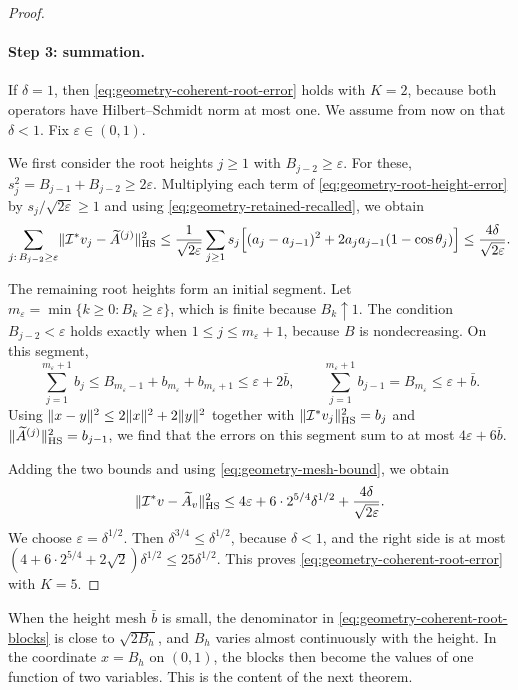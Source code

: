 \begin{proof}
\paragraph{Step 3: summation.}
If $\delta=1$, then \eqref{eq:geometry-coherent-root-error} holds with $K=2$, because both operators have Hilbert--Schmidt norm at most one. We assume from now on that $\delta<1$. Fix $\varepsilon\in(0,1)$.

We first consider the root heights $j\ge1$ with $B_{j-2}\ge\varepsilon$. For these, $s_j^2=B_{j-1}+B_{j-2}\ge2\varepsilon$. Multiplying each term of \eqref{eq:geometry-root-height-error} by $s_j/\sqrt{2\varepsilon}\ge1$ and using \eqref{eq:geometry-retained-recalled}, we obtain
\[
 \sum_{j:\,B_{j-2}\ge\varepsilon}\lVert\mathcal I^*v_j-\widetilde A^{(j)}\rVert_{\mathrm{HS}}^2
 \le\frac1{\sqrt{2\varepsilon}}\sum_{j\ge1}s_j\Bigl[(a_j-a_{j-1})^2+2a_ja_{j-1}(1-\cos\theta_j)\Bigr]
 \le\frac{4\delta}{\sqrt{2\varepsilon}} .
\]

The remaining root heights form an initial segment. Let $m_\varepsilon=\min\{k\ge0:B_k\ge\varepsilon\}$, which is finite because $B_k\uparrow1$. The condition $B_{j-2}<\varepsilon$ holds exactly when $1\le j\le m_\varepsilon+1$, because $B$ is nondecreasing. On this segment,
\[
 \sum_{j=1}^{m_\varepsilon+1}b_j\le B_{m_\varepsilon-1}+b_{m_\varepsilon}+b_{m_\varepsilon+1}\le\varepsilon+2\bar b,
 \qquad
 \sum_{j=1}^{m_\varepsilon+1}b_{j-1}=B_{m_\varepsilon}\le\varepsilon+\bar b .
\]
Using $\lVert x-y\rVert^2\le2\lVert x\rVert^2+2\lVert y\rVert^2$ together with $\lVert\mathcal I^*v_j\rVert_{\mathrm{HS}}^2=b_j$ and $\lVert\widetilde A^{(j)}\rVert_{\mathrm{HS}}^2=b_{j-1}$, we find that the errors on this segment sum to at most $4\varepsilon+6\bar b$.

Adding the two bounds and using \eqref{eq:geometry-mesh-bound}, we obtain
\[
 \lVert\mathcal I^*v-\widetilde A_v\rVert_{\mathrm{HS}}^2
 \le4\varepsilon+6\cdot2^{5/4}\delta^{1/2}+\frac{4\delta}{\sqrt{2\varepsilon}} .
\]
We choose $\varepsilon=\delta^{1/2}$. Then $\delta^{3/4}\le\delta^{1/2}$, because $\delta<1$, and the right side is at most $(4+6\cdot2^{5/4}+2\sqrt2)\delta^{1/2}\le25\delta^{1/2}$. This proves \eqref{eq:geometry-coherent-root-error} with $K=5$.
\end{proof}

When the height mesh $\bar b$ is small, the denominator in \eqref{eq:geometry-coherent-root-blocks} is close to $\sqrt{2B_h}$, and $B_h$ varies almost continuously with the height. In the coordinate $x=B_h$ on $(0,1)$, the blocks then become the values of one function of two variables. This is the content of the next theorem.

